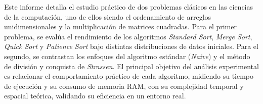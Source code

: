 Este informe detalla el estudio práctico de dos problemas clásicos en las ciencias de la computación, uno de ellos siendo el ordenamiento de arreglos unidimensionales y la multiplicación de matrices cuadradas. Para el primer problema, se evalúa el rendimiento de los algoritmos \textit{Standard Sort}, \textit{Merge Sort}, \textit{Quick Sort} y \textit{Patience Sort} bajo distintas distribuciones de datos iniciales. Para el segundo, se contrastan los enfoques del algoritmo estándar (\textit{Naive}) y el método de división y conquista de \textit{Strassen}. El principal objetivo del análisis experimental es relacionar el comportamiento práctico de cada algoritmo, midiendo su tiempo de ejecución y su consumo de memoria RAM, con su complejidad temporal y espacial teórica, validando su eficiencia en un entorno real.